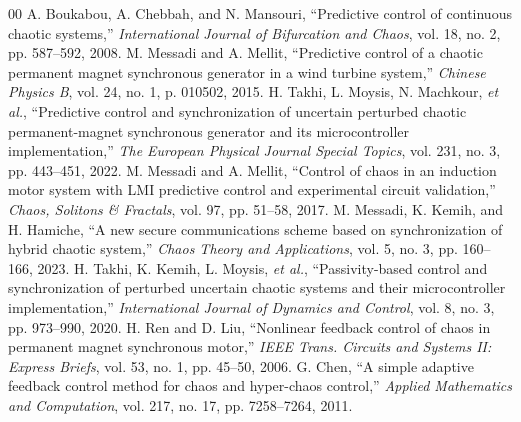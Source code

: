 \documentclass[conference]{IEEEtran}
\begin{document}
\begin{thebibliography}{00}
 A. Boukabou, A. Chebbah, and N. Mansouri, ``Predictive control of continuous chaotic systems,'' \textit{International Journal of Bifurcation and Chaos}, vol. 18, no. 2, pp. 587--592, 2008.
 M. Messadi and A. Mellit, ``Predictive control of a chaotic permanent magnet synchronous generator in a wind turbine system,'' \textit{Chinese Physics B}, vol. 24, no. 1, p. 010502, 2015.
 H. Takhi, L. Moysis, N. Machkour, \textit{et al.}, ``Predictive control and synchronization of uncertain perturbed chaotic permanent-magnet synchronous generator and its microcontroller implementation,'' \textit{The European Physical Journal Special Topics}, vol. 231, no. 3, pp. 443--451, 2022.
 M. Messadi and A. Mellit, ``Control of chaos in an induction motor system with LMI predictive control and experimental circuit validation,'' \textit{Chaos, Solitons \& Fractals}, vol. 97, pp. 51--58, 2017.
 M. Messadi, K. Kemih, and H. Hamiche, ``A new secure communications scheme based on synchronization of hybrid chaotic system,'' \textit{Chaos Theory and Applications}, vol. 5, no. 3, pp. 160--166, 2023.
 H. Takhi, K. Kemih, L. Moysis, \textit{et al.}, ``Passivity-based control and synchronization of perturbed uncertain chaotic systems and their microcontroller implementation,'' \textit{International Journal of Dynamics and Control}, vol. 8, no. 3, pp. 973--990, 2020.
 H. Ren and D. Liu, ``Nonlinear feedback control of chaos in permanent magnet synchronous motor,'' \textit{IEEE Trans. Circuits and Systems II: Express Briefs}, vol. 53, no. 1, pp. 45--50, 2006.
 G. Chen, ``A simple adaptive feedback control method for chaos and hyper-chaos control,'' \textit{Applied Mathematics and Computation}, vol. 217, no. 17, pp. 7258--7264, 2011.
\end{thebibliography}
\end{document}
